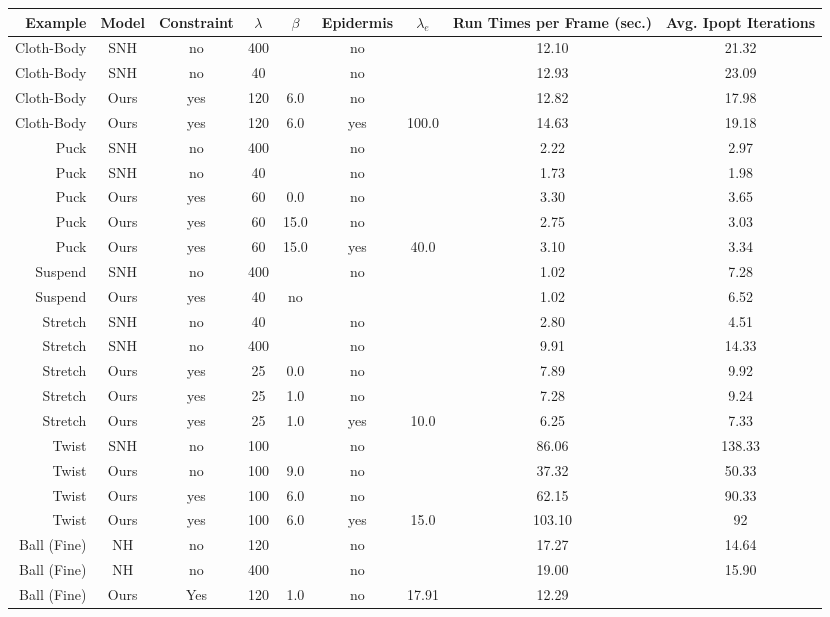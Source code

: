 \begin{table}[]
	\centering
	\begin{tabular}{@{}rcccccccc@{}}
		\toprule
		Example & Model & Constraint & $\lambda$ & $\beta$ & Epidermis & $\lambda_e$ & Run Times per Frame (sec.) & Avg. Ipopt Iterations \\
		\midrule
		Cloth-Body & SNH & no & 400 &  & no & & 12.10 & 21.32 \\
		Cloth-Body & SNH & no & 40 &  & no & & 12.93 & 23.09 \\
		Cloth-Body & Ours & yes & 120 & 6.0 & no & & 12.82 & 17.98 \\
		Cloth-Body & Ours & yes & 120 & 6.0 & yes & 100.0 & 14.63 & 19.18 \\
		\midrule
		Puck & SNH & no & 400 &   & no & & 2.22 & 2.97 \\
		Puck & SNH & no & 40 &   & no & & 1.73 & 1.98 \\
		Puck & Ours & yes & 60 & 0.0 & no & & 3.30 & 3.65 \\
		Puck & Ours & yes & 60 & 15.0 & no & & 2.75 & 3.03 \\
		Puck & Ours & yes & 60 & 15.0 & yes & 40.0 & 3.10 & 3.34 \\
		\midrule
		Suspend & SNH & no & 400 & & no & & 1.02 & 7.28 \\
		Suspend & Ours & yes & 40 & no & &  & 1.02 & 6.52 \\
		\midrule
		Stretch & SNH & no & 40 & & no & & 2.80 & 4.51 \\
		Stretch & SNH & no & 400 & & no & & 9.91 & 14.33 \\
		Stretch & Ours & yes & 25 & 0.0 & no & & 7.89 & 9.92 \\
		Stretch & Ours & yes & 25 & 1.0 & no & & 7.28 & 9.24 \\
		Stretch & Ours & yes & 25 & 1.0 & yes & 10.0 & 6.25 & 7.33 \\
		\midrule
		Twist & SNH & no & 100 & & no & & 86.06 & 138.33 \\
		Twist & Ours & no & 100 & 9.0 & no & & 37.32 & 50.33 \\
		Twist & Ours & yes & 100 & 6.0 & no & & 62.15 & 90.33 \\
		Twist & Ours & yes & 100 & 6.0 & yes & 15.0  & 103.10 & 92 \\
		\midrule
		Ball (Fine) & NH & no & 120 & & no & & 17.27 & 14.64 \\
		Ball (Fine) & NH & no & 400 & & no & & 19.00 & 15.90 \\
		Ball (Fine) & Ours & Yes & 120 & 1.0 & no & 17.91 & 12.29 \\

\end{tabular}
\end{table}
